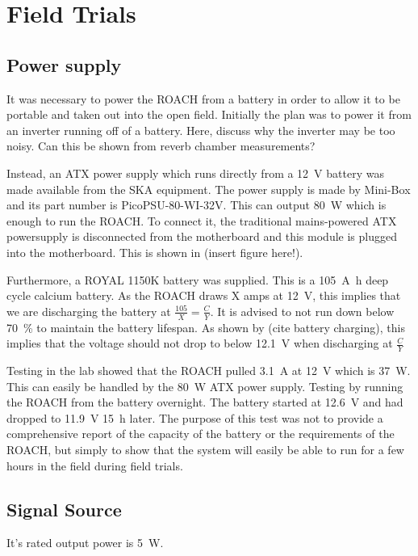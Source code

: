 \chapter{Field Trials}
\label{ch:field-trials}
\graphicspath{{./img/field-trials/}}

\section{Power supply}
It was necessary to power the ROACH from a battery in order to allow it to be portable and taken out into the open field.
Initially the plan was to power it from an inverter running off of a battery. Here, discuss why the inverter may be too noisy. Can this be shown from reverb chamber measurements?

Instead, an ATX power supply which runs directly from a \SI{12}{\volt} battery was made available from the SKA equipment. The power supply is made by Mini-Box and its part number is PicoPSU-80-WI-32V. This can output \SI{80}{\watt} which is enough to run the ROACH. To connect it, the traditional mains-powered ATX powersupply is disconnected from the motherboard and this module is plugged into the motherboard. This is shown in (insert figure here!).

Furthermore, a ROYAL 1150K battery was supplied. This is a \SI{105}{\ampere\hour} deep cycle calcium battery.
As the ROACH draws X amps at \SI{12}{\volt}, this implies that we are discharging the battery at \(\frac{105}{X} = \frac{C}{Y}\).
It is advised to not run down below \SI{70}{\percent} to maintain the battery lifespan. As shown by (cite battery charging), this implies that the voltage should not drop to below \SI{12.1}{\volt} when discharging at \(\frac{C}{Y}\)

Testing in the lab showed that the ROACH pulled \SI{3.1}{\ampere} at \SI{12}{\volt} which is \SI{37}{\watt}. This can easily be handled by the \SI{80}{\watt} ATX power supply. 
Testing by running the ROACH from the battery overnight. The battery started at \SI{12.6}{\volt} and had dropped to \SI{11.9}{\volt} \SI{15}{\hour} later. The purpose of this test was not to provide a comprehensive report of the capacity of the battery or the requirements of the ROACH, but simply to show that the system will easily be able to run for a few hours in the field during field trials.

\section{Signal Source}
It's rated output power is \SI{5}{\watt}. 


